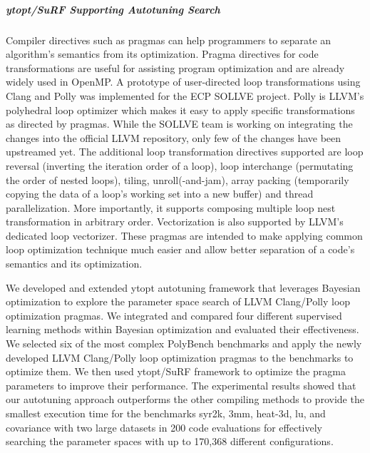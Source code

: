 \subparagraph{ytopt/SuRF Supporting Autotuning Search}

Compiler directives such as pragmas can help programmers to separate an algorithm's semantics from its optimization. Pragma directives for code transformations are useful for assisting program optimization and are already widely used in OpenMP. A prototype of user-directed loop transformations using Clang and Polly was implemented for the ECP SOLLVE project.
Polly is LLVM's polyhedral loop optimizer which makes it easy to apply specific transformations as directed by pragmas.
While the SOLLVE team is working on integrating the changes into the official LLVM repository, only few of the changes have been upstreamed yet.
The additional loop transformation directives supported are loop reversal (inverting the iteration order of a loop), loop interchange (permutating the order of nested loops), tiling, unroll(-and-jam), array packing (temporarily copying the data of a loop's working set into a new buffer) and thread parallelization. 
More importantly, it supports composing multiple loop nest transformation in arbitrary order. Vectorization is also supported by LLVM's dedicated loop vectorizer.
These pragmas are intended to make applying common loop optimization technique much easier and allow better separation of a code's semantics and its optimization.

We developed and extended ytopt autotuning framework that leverages Bayesian optimization to explore the parameter space search of LLVM Clang/Polly loop optimization pragmas. We integrated and compared four different supervised learning methods within Bayesian optimization and evaluated their effectiveness. We selected six of the most complex PolyBench benchmarks and apply the newly developed LLVM Clang/Polly loop optimization pragmas to the benchmarks to optimize them. We then used ytopt/SuRF framework to optimize the pragma parameters to improve their performance. The experimental results showed that our autotuning approach outperforms the other compiling methods to provide the smallest execution time for the benchmarks syr2k, 3mm, heat-3d, lu, and covariance with two large datasets in 200 code evaluations for effectively searching the parameter spaces with up to 170,368 different configurations. 


